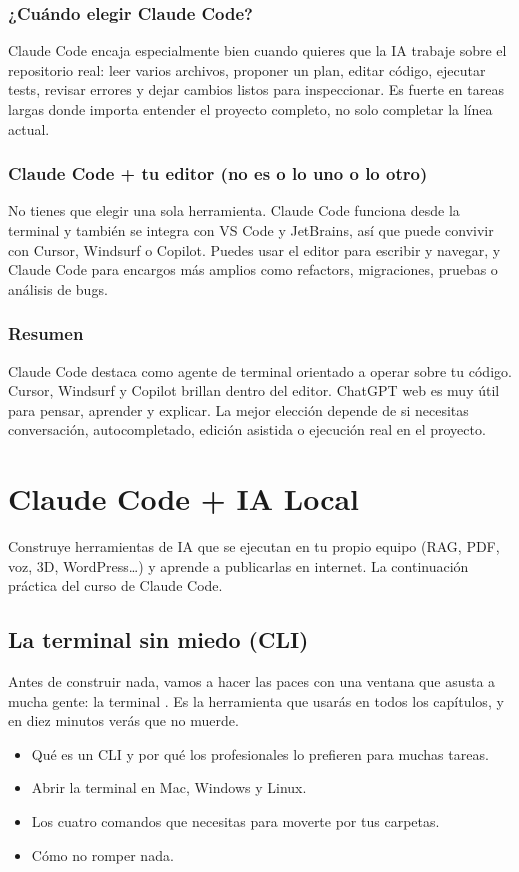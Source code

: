 \documentclass[11pt,a4paper]{book}
\begin{document}
\section{¿Cuándo elegir Claude Code?}
Claude Code encaja especialmente bien cuando quieres que la IA trabaje sobre el repositorio real: leer varios archivos, proponer un plan, editar código, ejecutar tests, revisar errores y dejar cambios listos para inspeccionar. Es fuerte en tareas largas donde importa entender el proyecto completo, no solo completar la línea actual.

\section{Claude Code + tu editor (no es o lo uno o lo otro)}
No tienes que elegir una sola herramienta. Claude Code funciona desde la terminal y también se integra con VS Code y JetBrains, así que puede convivir con Cursor, Windsurf o Copilot. Puedes usar el editor para escribir y navegar, y Claude Code para encargos más amplios como refactors, migraciones, pruebas o análisis de bugs.

\section{Resumen}
Claude Code destaca como agente de terminal orientado a operar sobre tu código. Cursor, Windsurf y Copilot brillan dentro del editor. ChatGPT web es muy útil para pensar, aprender y explicar. La mejor elección depende de si necesitas conversación, autocompletado, edición asistida o ejecución real en el proyecto.

\part{Claude Code + IA Local}
Construye herramientas de IA que se ejecutan en tu propio equipo (RAG, PDF, voz, 3D, WordPress…) y aprende a publicarlas en internet. La continuación práctica del curso de Claude Code.

\chapter{La terminal sin miedo (CLI)}
Antes de construir nada, vamos a hacer las paces con una ventana que asusta a mucha gente: la terminal . Es la herramienta que usarás en todos los capítulos, y en diez minutos verás que no muerde.

\begin{itemize}\item Qué es un CLI y por qué los profesionales lo prefieren para muchas tareas.\end{itemize}
\begin{itemize}\item Abrir la terminal en Mac, Windows y Linux.\end{itemize}
\begin{itemize}\item Los cuatro comandos que necesitas para moverte por tus carpetas.\end{itemize}
\begin{itemize}\item Cómo no romper nada.\end{itemize}
\end{document}
